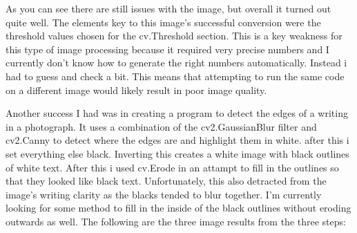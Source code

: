 \documentclass[]{article}
\begin{document}
	As you can see there are still issues with the image, but overall it turned out quite well. The elements key to this image's successful conversion were the threshold values chosen for the cv.Threshold section. This is a key weakness for this type of image processing because it required very precise numbers and I currently don't know how to generate the right numbers automatically. Instead i had to guess and check a bit. This means that attempting to run the same code on a different image would likely result in poor image quality.

	Another success I had was in creating a program to detect the edges of a writing in a photograph. It uses a combination of the cv2.GaussianBlur filter and cv2.Canny to detect where the edges are and highlight them in white. after this i set everything else black. Inverting this creates a white image with black outlines of white text. After this i used cv.Erode in an attampt to fill in the outlines so that they looked like black text. Unfortunately, this also detracted from the image's writing clarity as the blacks tended to blur together. I'm currently looking for some method to fill in the inside of the black outlines without eroding outwards as well. The following are the three image results from the three steps: \\
		
\end{document}
